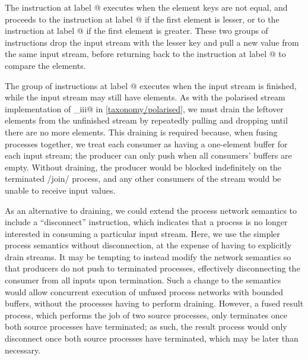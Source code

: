 The instruction at label @ executes when the element keys are not equal, and proceeds to the instruction at label @ if the first element is lesser, or to the instruction at label @ if the first element is greater.
These two groups of instructions drop the input stream with the lesser key and pull a new value from the same input stream, before returning back to the instruction at label @ to compare the elements.

The group of instructions at label @ executes when the \lstiproc@sB@ input stream is finished, while the \lstiproc@sA@ input stream may still have elements.
As with the polarised stream implementation of \lstiproc@join_iii@ in \cref{taxonomy/polarised}, we must drain the leftover elements from the unfinished stream by repeatedly pulling and dropping until there are no more elements.
This draining is required because, when fusing processes together, we treat each consumer as having a one-element buffer for each input stream; the producer can only push when all consumers' buffers are empty.
Without draining, the producer would be blocked indefinitely on the terminated \Hs/join/ process, and any other consumers of the stream would be unable to receive input values.

As an alternative to draining, we could extend the process network semantics to include a ``disconnect'' instruction, which indicates that a process is no longer interested in consuming a particular input stream.
Here, we use the simpler process semantics without disconnection, at the expense of having to explicitly drain streams.
It may be tempting to instead modify the network semantics so that producers do not push to terminated processes, effectively disconnecting the consumer from all inputs upon termination.
Such a change to the semantics would allow concurrent execution of unfused process networks with bounded buffers, without the processes having to perform draining.
However, a fused result process, which performs the job of two source processes, only terminates once both source processes have terminated; as such, the result process would only disconnect once both source processes have terminated, which may be later than necessary.


